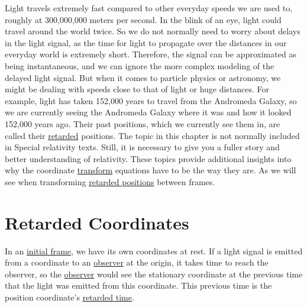 Light travels extremely fast compared to other everyday speeds we are used to, roughly at 300,000,000 meters per second.
In the blink of an eye, light could travel around the world twice.
So we do not normally need to worry about delays in the light signal, as the time for light to propagate over the distances in our everyday world is extremely short.
Therefore, the signal can be approximated as being instantaneous, and we can ignore the more complex modeling of the delayed light signal.
But when it comes to particle physics or astronomy, we might be dealing with speeds close to that of light or huge distances.
For example, light has taken 152,000 years to travel from the Andromeda Galaxy, so we are currently seeing the Andromeda Galaxy where it was and how it looked 152,000 years ago.
Their past positions, which we currently see them in, are called their \hyperlink{def-retarded-position}{retarded} positions.
The topic in this chapter is not normally included in Special relativity texts.
Still, it is necessary to give you a fuller story and better understanding of relativity.
These topics provide additional insights into why the coordinate \hyperlink{def-transform}{transform} equations have to be the way they are.
As we will see when transforming \hyperlink{def-retarded-position}{retarded positions} between frames.

\section{Retarded Coordinates} \label{sect: Retarded Coordinates}

In an \hyperlink{def-initial-Frame}{initial frame}, we have its own coordinates at rest.
If a light signal is emitted from a coordinate to an \hyperlink{def-observer}{observer} at the origin, it takes time to reach the observer, so the \hyperlink{def-observer}{observer} would see the stationary coordinate at the previous time that the light was emitted from this coordinate.
This previous time is the position coordinate's \hyperlink{def-retarded-time}{retarded time}.


